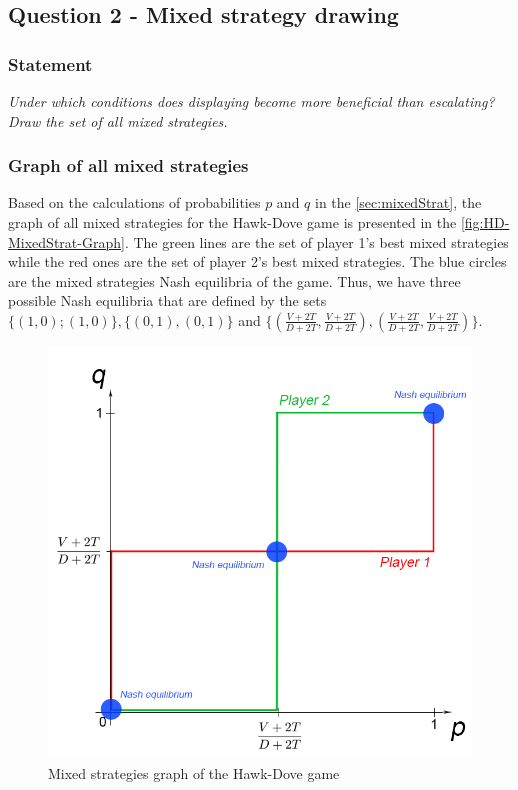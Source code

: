 \documentclass{article}
\begin{document}
\subsection{Question 2 - Mixed strategy drawing}

\subsubsection*{Statement}

\textit{Under which conditions does displaying become more beneficial than escalating? Draw the set of all mixed strategies.} 

\subsubsection*{Graph of all mixed strategies}

Based on the calculations of probabilities $p$ and $q$ in the \autoref{sec:mixedStrat}, the graph of all mixed strategies for the Hawk-Dove game is presented in the \autoref{fig:HD-MixedStrat-Graph}. The green lines are the set of player 1's best mixed strategies while the red ones are the set of player 2's best mixed strategies. The blue circles are the mixed strategies Nash equilibria of the game. Thus, we have three possible Nash equilibria that are defined by the sets $\{(1,0);(1,0)\}, \{(0,1),(0,1)\}$ and $  \{(\frac{V+2T}{D+2T},\frac{V+2T}{D+2T}),(\frac{V+2T}{D+2T},\frac{V+2T}{D+2T})\}$.  

\begin{figure}[h]
  \centering
  \includegraphics[scale=0.35]{figures/HD-MixedStrat-Graph.png}
  \caption{Mixed strategies graph of the Hawk-Dove game}
  \label{fig:HD-MixedStrat-Graph}
\end{figure}
\end{document}
